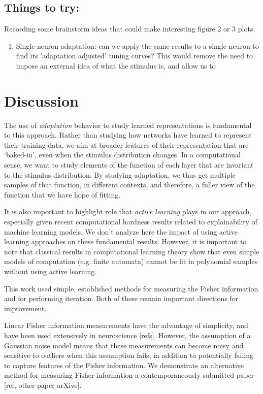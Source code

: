 \documentclass[10pt]{article}      %
\begin{document}
\subsection{Things to try:}
Recording some brainstorm ideas that could make interesting figure 2 or 3 plots.
\begin{enumerate}
  \item Single neuron adaptation: can we apply the same results to a single neuron to find its 'adaptation adjusted' tuning curves? This would remove the need to impose an external idea of what the stimulus is, and allow us to
\end{enumerate}




\section{Discussion}


The use of \textit{adaptation} behavior to study learned representations is fundamental to this approach.
Rather than studying how networks have learned to represent their training data, we aim at broader features of their representation that are `baked-in', even when the stimulus distribution changes.
In a computational sense, we want to study elements of the function of each layer that are invariant to the stimulus distribution.
By studying adaptation, we thus get multiple samples of that function, in different contexts, and therefore, a fuller view of the function that we have hope of fitting.

It is also important to highlight role that \textit{active learning} plays in our approach, especially given recent computational hardness results \cite{goldwasser_planting_2022} related to explainability of machine learning models.
We don't analyze here the impact of using active learning approaches on these fundamental results.
However, it is important to note that classical results in computational learning theory \cite{kearns1994introduction} show that even simple models of computation (e.g. finite automata) cannot be fit in polynomial samples without using active learning.



This work used simple, established methods for measuring the Fisher information and for performing iteration.
Both of these remain important directions for improvement.

Linear Fisher information measurements have the advantage of simplicity, and have been used extensively in neuroscience [refs].
However, the assumption of a Gaussian noise model means that these measurements can become noisy and sensitive to outliers when this assumption fails, in addition to potentially failing to capture features of the Fisher information.
We demonstrate an alternative method for measuring Fisher information a contemporaneously submitted paper [ref, other paper arXive].
\end{document}
